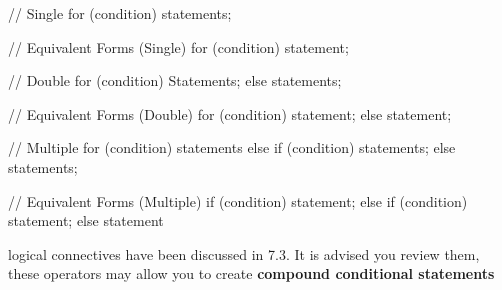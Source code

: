 \documentclass{report}
\begin{document}
    \begin{cppcode}

    // Single
    for (condition){
        statements;
    }

    // Equivalent Forms (Single)
    for (condition)
        statement;

    // Double
    for (condition){
        Statements;
    }else {
        statements;
    }

    // Equivalent Forms (Double)
    for (condition)
        statement;
    else 
        statement;

    // Multiple
    for (condition){
        statements
    }else if (condition){
        statements;
    }else {
       statements; 
    }

    // Equivalent Forms (Multiple)
    if (condition)
        statement;
    else if (condition)
        statement;
    else 
        statement

    \end{cppcode}
    

    \bigbreak \noindent 
    \begin{notebox}
        logical connectives have been discussed in 7.3. It is advised you review them, these operators may allow you to create \textbf{compound conditional statements}
    \end{notebox}

    \pagebreak
\end{document}
